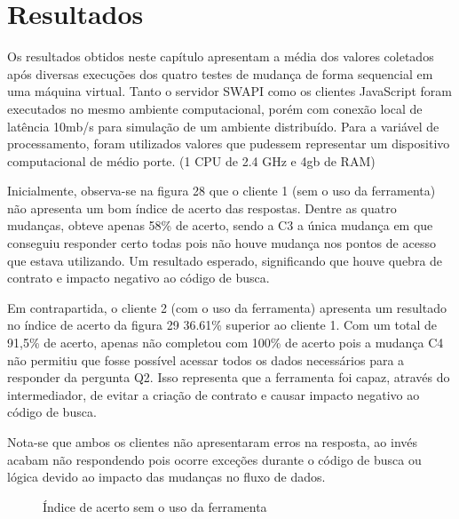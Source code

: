\section{Resultados}

Os resultados obtidos neste capítulo apresentam a média dos valores coletados após diversas execuções dos quatro testes de mudança de forma sequencial em uma máquina virtual. Tanto o servidor SWAPI como os clientes JavaScript foram executados no mesmo ambiente computacional, porém com conexão local de latência 10mb/s para simulação de um ambiente distribuído. Para a variável de processamento, foram utilizados valores que pudessem representar um dispositivo computacional de médio porte. (1 CPU de 2.4 GHz e 4gb de RAM)

Inicialmente, observa-se na figura 28 que o cliente 1 (sem o uso da ferramenta) não apresenta um bom índice de acerto das respostas. Dentre as quatro mudanças, obteve apenas 58\% de acerto, sendo a C3 a única mudança em que conseguiu responder certo todas pois não houve mudança nos pontos de acesso que estava utilizando. Um resultado esperado, significando que houve quebra de contrato e impacto negativo ao código de busca.

Em contrapartida, o cliente 2 (com o uso da ferramenta) apresenta um resultado no índice de acerto da figura 29 36.61\% superior ao cliente 1. Com um total de 91,5\% de acerto, apenas não completou com 100\% de acerto pois a mudança C4 não permitiu que fosse possível acessar todos os dados necessários para a responder da pergunta Q2. Isso representa que a ferramenta foi capaz, através do intermediador, de evitar a criação de contrato e causar impacto negativo ao código de busca.

Nota-se que ambos os clientes não apresentaram erros na resposta, ao invés acabam não respondendo pois ocorre exceções durante o código de busca ou lógica devido ao impacto das mudanças no fluxo de dados.

\begin{figure}[H]
  \centering
  \caption{Índice de acerto sem o uso da ferramenta}
\end{figure}

